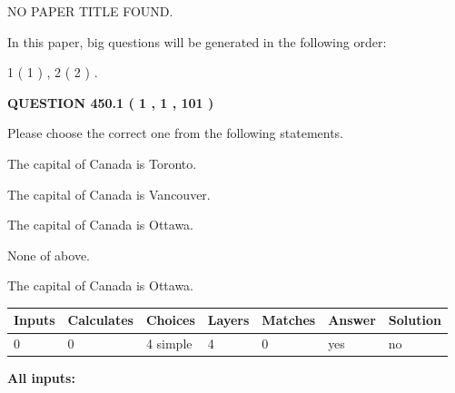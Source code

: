 \documentclass[12pt]{article}
\begin{document}
   
   
   
 NO PAPER TITLE FOUND.
   
   
   
\vspace{0.2in}
   
In this paper, big questions will be generated in the following order: 
   
   
   1 ( 1 )
 ,
   2 ( 2 )
 .
  
\vspace{0.2in}
  
{\textbf{\Large{QUESTION
450.1 
 ( 1 , 1 , 101 )
}}}
  
  
Please choose the correct one from the following statements.
 
 
The capital of Canada is Toronto.
 
 
The capital of Canada is Vancouver.
 
 
The capital of Canada is Ottawa.
 
 
 None of above.
 
 
\noindent{}
 
 
The capital of Canada is Ottawa.
 
 
\noindent{}
 
 
   
   
   
   
\noindent\begin{tabular}{|l|l|l|l|l|l|l|}
 \hline
Inputs & Calculates & Choices & Layers & Matches & Answer & Solution \\ \hline
 0  & 
 0  & 
 4
  simple  
  & 
 4  & 
 0  & 
  yes & 
  no 
  \\ \hline
 \end{tabular}
   
   
   
   
\noindent{}
   
   
   
   
\noindent\vspace{0.1in}\hspace{-0.08in} {\textbf{\Large{All inputs: }}}
   
   
  
\end{document}
